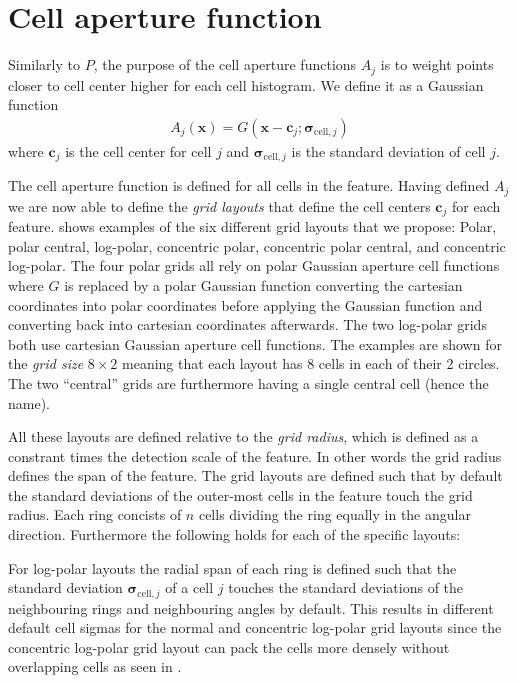 \documentclass[thesis.tex]{subfiles}
\def\x{\mathbf{x}}
\def\c{\mathbf{c}}
\def\sigmacellj{\boldsymbol{\sigma}_{\text{cell},j}}
\begin{document}
\section{Cell aperture function}
%
Similarly to $P$, the purpose of the cell aperture functions $A_j$ is to weight points closer to cell center higher for each cell histogram. We define it as a Gaussian function
%
\begin{align}
A_j(\x) = G(\x - \c_j; \sigmacellj)
\end{align}
%
where $\c_j$ is the cell center for cell $j$ and $\sigmacellj$ is the standard deviation of cell $j$.

The cell aperture function is defined for all cells in the feature. Having defined $A_j$ we are now able to define the \emph{grid layouts} that define the cell centers $\boldsymbol{c}_j$ for each feature.
 shows examples of the six different grid layouts that we propose: Polar, polar central, log-polar, concentric polar, concentric polar central, and concentric log-polar. The four polar grids all rely on polar Gaussian aperture cell functions where $G$ is replaced by a polar Gaussian function converting the cartesian coordinates into polar coordinates before applying the Gaussian function and converting back into cartesian coordinates afterwards. The two log-polar grids both use cartesian Gaussian aperture cell functions. The examples are shown for the \emph{grid size} $8\times 2$ meaning that each layout has 8 cells in each of their 2 circles. The two ``central'' grids are furthermore having a single central cell (hence the name).

All these layouts are defined relative to the \emph{grid radius}, which is defined as a constrant times the detection scale of the feature. In other words the grid radius defines the span of the feature. The grid layouts are defined such that by default the standard deviations of the outer-most cells in the feature touch the grid radius. Each ring concists of $n$ cells dividing the ring equally in the angular direction. Furthermore the following holds for each of the specific layouts:

For log-polar layouts the radial span of each ring is defined such that the standard deviation $\sigmacellj$ of a cell $j$ touches the standard deviations of the neighbouring rings and neighbouring angles by default. This results in different default cell sigmas for the normal and concentric log-polar grid layouts since the concentric log-polar grid layout can pack the cells more densely without overlapping cells as seen in .
\end{document}
